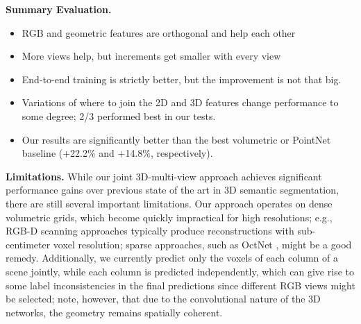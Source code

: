 \vspace{0.2cm}\noindent
\textbf{Summary Evaluation.}
\vspace{-0.2cm}
\begin{itemize}
	\item RGB and geometric features are orthogonal and help each other
	\item More views help, but increments get smaller with every view
	\item End-to-end training is strictly better, but the improvement is not that big.
	\item Variations of where to join the 2D and 3D features change performance to some degree; 2/3 performed best in our tests.
	\item Our results are significantly better than the best volumetric or PointNet baseline (+22.2\% and +14.8\%, respectively).
\end{itemize}

\noindent
\textbf{Limitations.}
While our joint 3D-multi-view approach achieves significant performance gains over previous state of the art in 3D semantic segmentation, there are still several important limitations.
Our approach operates on dense volumetric grids, which become quickly impractical for high resolutions; e.g., RGB-D scanning approaches typically produce reconstructions with sub-centimeter voxel resolution; sparse approaches, such as OctNet \cite{riegler2017OctNet}, might be a good remedy.
Additionally, we currently predict only the voxels of each column of a scene jointly, while each column is predicted independently, which can give rise to some label inconsistencies in the final predictions since different RGB views might be selected; note, however, that due to the convolutional nature of the 3D networks, the geometry remains spatially coherent.

